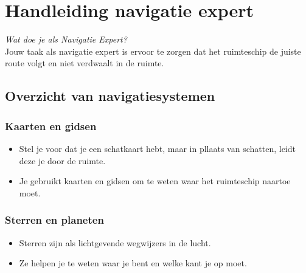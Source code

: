 \section{Handleiding navigatie expert}

\textit{Wat doe je als Navigatie Expert?} \\
Jouw taak als navigatie expert is ervoor te zorgen dat het ruimteschip de juiste route volgt en niet verdwaalt in de ruimte.

\subsection{Overzicht van navigatiesystemen}

\subsubsection{Kaarten en gidsen}
\begin{itemize}
    \item Stel je voor dat je een schatkaart hebt, maar in pllaats van schatten, leidt deze je door de ruimte.
    \item Je gebruikt kaarten en gidsen om te weten waar het ruimteschip naartoe moet.
\end{itemize}

\subsubsection{Sterren en planeten}
\begin{itemize}
    \item Sterren zijn als lichtgevende wegwijzers in de lucht.
    \item Ze helpen je te weten waar je bent en welke kant je op moet.
\end{itemize}


\subsection{}